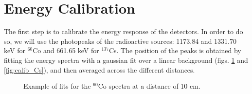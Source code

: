 \section{Energy Calibration}
\label{sec:calibration}

The first step is to calibrate the energy response of the detectors. In order to do so, we will use the photopeaks of the radioactive sources: 1173.84 and 1331.70 keV for $^{60}$Co and 661.65 keV for $^{137}$Cs. The position of the peaks is obtained by fitting the energy spectra with a gaussian fit over a linear background (figs. \ref{fig:calib_Co} and \ref{fig:calib_Cs}), and then averaged across the different distances. 


\begin{figure}[H]
	\begin{minipage}[c]{0.5\linewidth}
	\end{minipage}
	\begin{minipage}[]{0.5\linewidth}
	\centering
	\end{minipage}
	\caption{\label{fig:calib_Co} Example of fits for the $^{60}$Co spectra at a distance of 10 cm.}
	\end{figure}


